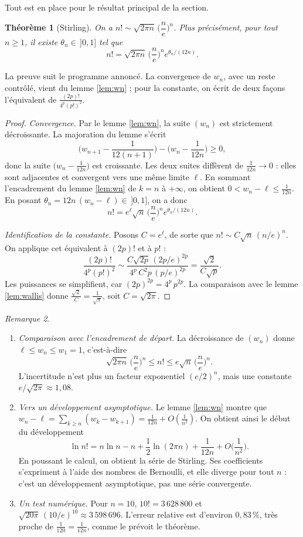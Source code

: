 \documentclass[11pt,a4paper]{article}
\theoremstyle{plain}
\newtheorem{theoreme}{Théorème}[section]
\theoremstyle{definition}
\theoremstyle{remark}
\newtheorem{remarque}[theoreme]{Remarque}
\begin{document}
Tout est en place pour le résultat principal de la section.

\begin{theoreme}[Stirling]\label{thm:stirling}
On a $n!\sim\sqrt{2\pi n}\,\Big(\dfrac ne\Big)^n$. Plus précisément, pour tout $n\geq1$, il existe $\theta_n\in\,]0,1]$ tel que
\[
  n!=\sqrt{2\pi n}\,\Big(\frac ne\Big)^n e^{\theta_n/(12n)} .
\]
\end{theoreme}

La preuve suit le programme annoncé. La convergence de $w_n$, avec un reste contrôlé, vient du lemme \ref{lem:wn} ; pour la constante, on écrit de deux façons l'équivalent de $\frac{(2p)!}{4^p(p!)^2}$.

\begin{proof}
\emph{Convergence.} Par le lemme \ref{lem:wn}, la suite $(w_n)$ est strictement décroissante. La majoration du lemme s'écrit
\[
  \Big(w_{n+1}-\frac1{12(n+1)}\Big)-\Big(w_n-\frac1{12n}\Big)\geq0,
\]
donc la suite $\big(w_n-\frac1{12n}\big)$ est croissante. Les deux suites diffèrent de $\frac1{12n}\to0$ : elles sont adjacentes et convergent vers une même limite $\ell$. En sommant l'encadrement du lemme \ref{lem:wn} de $k=n$ à $+\infty$, on obtient $0<w_n-\ell\leq\frac1{12n}$. En posant $\theta_n=12n\,(w_n-\ell)\in\,]0,1]$, on a donc
\[
  n!=e^{\ell}\sqrt n\,\Big(\frac ne\Big)^n e^{\theta_n/(12n)} .
\]

\emph{Identification de la constante.} Posons $C=e^\ell$, de sorte que $n!\sim C\sqrt n\,(n/e)^n$. On applique cet équivalent à $(2p)!$ et à $p!$ :
\[
  \frac{(2p)!}{4^p(p!)^2}\sim\frac{C\sqrt{2p}\,(2p/e)^{2p}}{4^p\,C^2p\,(p/e)^{2p}}=\frac{\sqrt2}{C\sqrt p}.
\]
Les puissances se simplifient, car $(2p)^{2p}=4^p\,p^{2p}$. La comparaison avec le lemme \ref{lem:wallis} donne $\frac{\sqrt2}C=\frac1{\sqrt\pi}$, soit $C=\sqrt{2\pi}$.
\end{proof}

\begin{remarque}
\begin{enumerate}[nosep]
\item \emph{Comparaison avec l'encadrement de départ.} La décroissance de $(w_n)$ donne $\ell\leq w_n\leq w_1=1$, c'est-à-dire
\[
  \sqrt{2\pi n}\,\Big(\frac ne\Big)^n\leq n!\leq e\sqrt n\,\Big(\frac ne\Big)^n .
\]
L'incertitude n'est plus un facteur exponentiel $(e/2)^n$, mais une constante $e/\sqrt{2\pi}\approx1{,}08$.
\item \emph{Vers un développement asymptotique.} Le lemme \ref{lem:wn} montre que $w_n-\ell=\sum_{k\geq n}(w_k-w_{k+1})=\frac1{12n}+O(\frac1{n^2})$. On obtient ainsi le début du développement
\[
  \ln n!=n\ln n-n+\frac12\ln(2\pi n)+\frac1{12n}+O\Big(\frac1{n^2}\Big).
\]
En poussant le calcul, on obtient la série de Stirling. Ses coefficients s'expriment à l'aide des nombres de Bernoulli, et elle diverge pour tout $n$ : c'est un développement asymptotique, pas une série convergente.
\item \emph{Un test numérique.} Pour $n=10$, $10!=3\,628\,800$ et $\sqrt{20\pi}\,(10/e)^{10}\approx3\,598\,696$. L'erreur relative est d'environ $0{,}83\,\%$, très proche de $\frac1{120}=\frac1{12n}$, comme le prévoit le théorème.
\end{enumerate}
\end{remarque}
\end{document}
